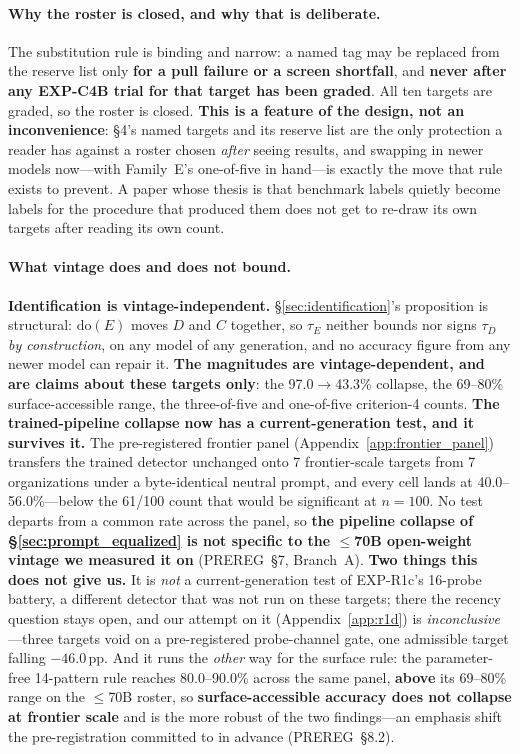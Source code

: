 \paragraph{Why the roster is closed, and why that is deliberate.} The substitution rule is binding and narrow: a named tag may be replaced from the reserve list only \textbf{for a pull failure or a screen shortfall}, and \textbf{never after any EXP-C4B trial for that target has been graded}. All ten targets are graded, so the roster is closed. \textbf{This is a feature of the design, not an inconvenience}: §4's named targets and its reserve list are the only protection a reader has against a roster chosen \emph{after} seeing results, and swapping in newer models now---with Family~E's one-of-five in hand---is exactly the move that rule exists to prevent. A paper whose thesis is that benchmark labels quietly become labels for the procedure that produced them does not get to re-draw its own targets after reading its own count.

\paragraph{What vintage does and does not bound.} \textbf{Identification is vintage-independent.} §\ref{sec:identification}'s proposition is structural: $\mathrm{do}(E)$ moves $D$ and $C$ together, so $\tau_E$ neither bounds nor signs $\tau_D$ \emph{by construction}, on any model of any generation, and no accuracy figure from any newer model can repair it. \textbf{The magnitudes are vintage-dependent, and are claims about these targets only}: the 97.0$\to$43.3\% collapse, the 69--80\% surface-accessible range, the three-of-five and one-of-five criterion-4 counts. \textbf{The trained-pipeline collapse now has a current-generation test, and it survives it.} The pre-registered frontier panel (Appendix~\ref{app:frontier_panel}) transfers the trained detector unchanged onto 7 frontier-scale targets from 7 organizations under a byte-identical neutral prompt, and every cell lands at 40.0--56.0\%---below the 61/100 count that would be significant at $n\!=\!100$. No test departs from a common rate across the panel, so \textbf{the pipeline collapse of §\ref{sec:prompt_equalized} is not specific to the $\leq$70B open-weight vintage we measured it on} (PREREG~§7, Branch~A). \textbf{Two things this does not give us.} It is \emph{not} a current-generation test of EXP-R1c's 16-probe battery, a different detector that was not run on these targets; there the recency question stays open, and our attempt on it (Appendix~\ref{app:r1d}) is \emph{inconclusive}---three targets void on a pre-registered probe-channel gate, one admissible target falling $-46.0$\,pp. And it runs the \emph{other} way for the surface rule: the parameter-free 14-pattern rule reaches 80.0--90.0\% across the same panel, \textbf{above} its 69--80\% range on the $\leq$70B roster, so \textbf{surface-accessible accuracy does not collapse at frontier scale} and is the more robust of the two findings---an emphasis shift the pre-registration committed to in advance (PREREG~§8.2).

